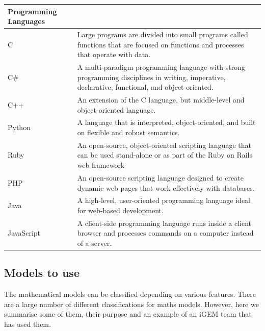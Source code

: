 \documentclass[11pt, letterpaper, english]{article}
\begin{document}
\begin{table}[h]
\begin{tabular}{| m{3cm} | m{9cm}|}
\hline
\multicolumn{1}{|l|}{\textbf{Programming Languages}}                  \\ \hline
\multicolumn{1}{|l|}{C} & Large programs are divided into small programs called functions that are focused on functions and processes that operate with data. \\ \hline
\multicolumn{1}{|l|}{C\#} &
  A multi-paradigm programming language with strong programming disciplines in writing, imperative, declarative, functional, and object-oriented. \\ \hline
\multicolumn{1}{|l|}{C++}    & An extension of the C language, but middle-level and object-oriented language.                                                  \\ \hline
\multicolumn{1}{|l|}{Python} & A language that is interpreted, object-oriented, and built on flexible and robust semantics.                                    \\ \hline
\multicolumn{1}{|l|}{Ruby}   & An open-source, object-oriented scripting language that can be used stand-alone or as part of the Ruby on Rails web framework   \\ \hline
\multicolumn{1}{|l|}{PHP}    & An open-source scripting language designed to create dynamic web pages that work effectively with databases.                    \\ \hline
\multicolumn{1}{|l|}{Java}   & A high-level, user-oriented programming language ideal for web-based development.                                              \\ \hline
\multicolumn{1}{|l|}{JavaScript} &
  A client-side programming language runs inside a client browser and processes commands on a computer instead of a server. \\ \hline
\end{tabular}
\end{table}


\subsection{Models to use}
\par{The mathematical models can be classified depending on various features. There are a large number of different classifications for maths models. However, here we summarise some of them, their purpose and an example of an iGEM team that has used them.} 
\end{document}
